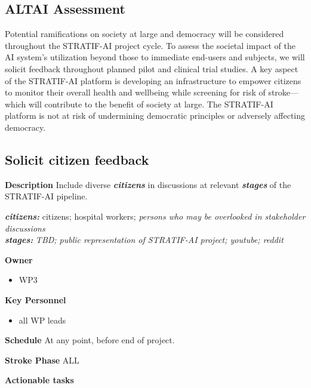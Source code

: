 \documentclass[
  letterpaper,
  DIV=11,
  numbers=noendperiod]{scrreport}
\providecommand{\tightlist}{%
  \setlength{\itemsep}{0pt}\setlength{\parskip}{0pt}}\usepackage{longtable,booktabs,array}
\begin{document}
\hypertarget{altai-assessment-15}{%
\subsection*{ALTAI Assessment}\label{altai-assessment-15}}

Potential ramifications on society at large and democracy will be
considered throughout the STRATIF-AI project cycle. To assess the
societal impact of the AI system's utilization beyond those to immediate
end-users and subjects, we will solicit feedback throughout planned
pilot and clinical trial studies. A key aspect of the STRATIF-AI
platform is developing an infrastructure to empower citizens to monitor
their overall health and wellbeing while screening for risk of
stroke---which will contribute to the benefit of society at large. The
STRATIF-AI platform is not at risk of undermining democratic principles
or adversely affecting democracy.

\hypertarget{solicit-citizen-feedback}{%
\subsection{Solicit citizen feedback}\label{solicit-citizen-feedback}}

\textbf{Description} Include diverse \textbf{\emph{citizens}} in
discussions at relevant \textbf{\emph{stages}} of the STRATIF-AI
pipeline.

\textbf{\emph{citizens:}} citizens; hospital workers; \emph{persons who
may be overlooked in stakeholder discussions}\\
\textbf{\emph{stages:}} \emph{TBD; public representation of STRATIF-AI
project; youtube; reddit}

\textbf{Owner}

\begin{itemize}
\tightlist
\item
  WP3
\end{itemize}

\textbf{Key Personnel}

\begin{itemize}
\tightlist
\item
  all WP leads
\end{itemize}

\textbf{Schedule} At any point, before end of project.

\textbf{Stroke Phase} ALL

\textbf{Actionable tasks}
\end{document}
